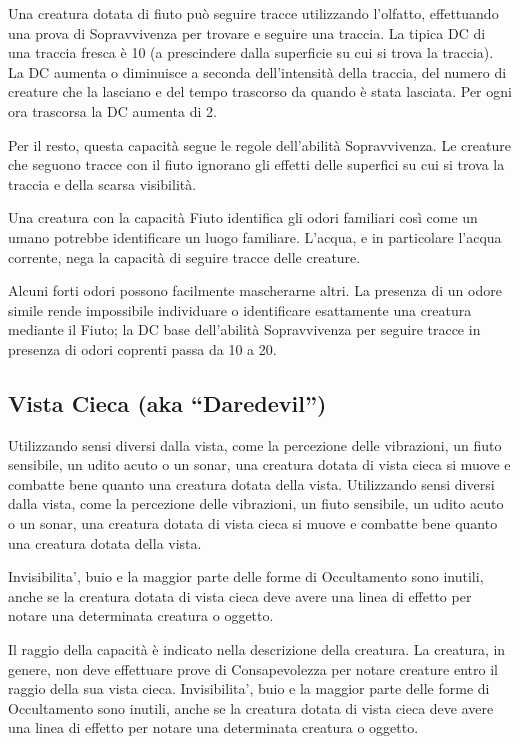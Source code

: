 \documentclass[a4paper,11pt,twoside,openany]{book}
\begin{document}
Una creatura dotata di fiuto può seguire tracce utilizzando l'olfatto, effettuando una prova di Sopravvivenza per trovare e seguire una traccia. La tipica DC di una traccia fresca è 10 (a prescindere dalla superficie su cui si trova la traccia). La DC aumenta o diminuisce a seconda dell'intensità della traccia, del numero di creature che la lasciano e del tempo trascorso da quando è stata lasciata. Per ogni ora trascorsa la DC aumenta di 2.

Per il resto, questa capacità segue le regole dell'abilità Sopravvivenza. Le creature che seguono tracce con il fiuto ignorano gli effetti delle superfici su cui si trova la traccia e della scarsa visibilità.

Una creatura con la capacità Fiuto identifica gli odori familiari così come un umano potrebbe identificare un luogo familiare. L'acqua, e in particolare l'acqua corrente, nega la capacità di seguire tracce delle creature.

Alcuni forti odori possono facilmente mascherarne altri. La presenza di un odore simile rende impossibile individuare o identificare esattamente una creatura mediante il Fiuto; la DC base dell'abilità Sopravvivenza per seguire tracce in presenza di odori coprenti passa da 10 a 20.


\subsection{Vista Cieca (aka “Daredevil”)}

Utilizzando sensi diversi dalla vista, come la percezione delle vibrazioni, un fiuto sensibile, un udito acuto o un sonar, una creatura dotata di vista cieca si muove e combatte bene quanto una creatura dotata della vista. 
Utilizzando sensi diversi dalla vista, come la percezione delle vibrazioni, un fiuto sensibile, un udito acuto o un sonar, una creatura dotata di vista cieca si muove e combatte bene quanto una creatura dotata della vista. 

Invisibilita’, buio e la maggior parte delle forme di Occultamento sono inutili, anche se la creatura dotata di vista cieca deve avere una linea di effetto per notare una determinata creatura o oggetto. 

Il raggio della capacità è indicato nella descrizione della creatura. La creatura, in genere, non deve effettuare prove di Consapevolezza per notare creature entro il raggio della sua vista cieca.
Invisibilita’, buio e la maggior parte delle forme di Occultamento sono inutili, anche se la creatura dotata di vista cieca deve avere una linea di effetto per notare una determinata creatura o oggetto. 
\end{document}
